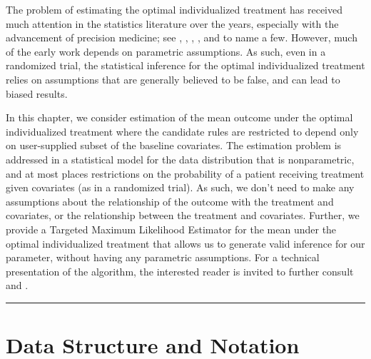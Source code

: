 \documentclass[12pt, krantz2,]{book}
\theoremstyle{definition}
\theoremstyle{definition}
\theoremstyle{definition}
\newcommand{\1}{\mathbbm{1}}
\begin{document}
The problem of estimating the optimal individualized treatment has received much
attention in the statistics literature over the years, especially with the
advancement of precision medicine; see \citet{murphy2003}, \citet{robins2004}, \citet{laber2012},
\citet{kosorok2012}, \citet{moodie2013} and \citet{robins2014} to name a few. However, much of the
early work depends on parametric assumptions. As such, even in a randomized
trial, the statistical inference for the optimal individualized treatment relies
on assumptions that are generally believed to be false, and can lead to biased
results.

In this chapter, we consider estimation of the mean outcome under the optimal
individualized treatment where the candidate rules are restricted to depend only
on user-supplied subset of the baseline covariates. The estimation problem is
addressed in a statistical model for the data distribution that is
nonparametric, and at most places restrictions on the probability of a patient
receiving treatment given covariates (as in a randomized trial). As such, we
don't need to make any assumptions about the relationship of the outcome with
the treatment and covariates, or the relationship between the treatment and
covariates. Further, we provide a Targeted Maximum Likelihood Estimator for the
mean under the optimal individualized treatment that allows us to generate valid
inference for our parameter, without having any parametric assumptions. For a
technical presentation of the algorithm, the interested reader is invited to
further consult \citet{vanderLaanLuedtke15} and \citet{luedtke2016super}.

\begin{center}\rule{0.5\linewidth}{0.5pt}\end{center}

\hypertarget{data-structure-and-notation}{%
\section{Data Structure and Notation}\label{data-structure-and-notation}}
\end{document}
